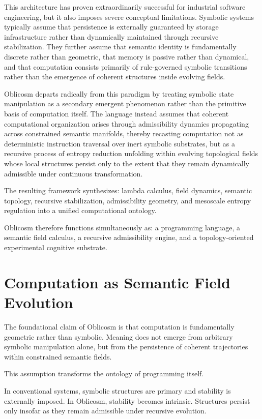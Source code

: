 \documentclass[11pt]{article}
\begin{document}
This architecture has proven extraordinarily successful for industrial software engineering, but it also imposes severe conceptual limitations. Symbolic systems typically assume that persistence is externally guaranteed by storage infrastructure rather than dynamically maintained through recursive stabilization. They further assume that semantic identity is fundamentally discrete rather than geometric, that memory is passive rather than dynamical, and that computation consists primarily of rule-governed symbolic transitions rather than the emergence of coherent structures inside evolving fields.

Oblicosm departs radically from this paradigm by treating symbolic state manipulation as a secondary emergent phenomenon rather than the primitive basis of computation itself. The language instead assumes that coherent computational organization arises through admissibility dynamics propagating across constrained semantic manifolds, thereby recasting computation not as deterministic instruction traversal over inert symbolic substrates, but as a recursive process of entropy reduction unfolding within evolving topological fields whose local structures persist only to the extent that they remain dynamically admissible under continuous transformation.

The resulting framework synthesizes:
lambda calculus,
field dynamics,
semantic topology,
recursive stabilization,
admissibility geometry,
and mesoscale entropy regulation
into a unified computational ontology.

Oblicosm therefore functions simultaneously as:
a programming language,
a semantic field calculus,
a recursive admissibility engine,
and a topology-oriented experimental cognitive substrate.

\section{Computation as Semantic Field Evolution}

The foundational claim of Oblicosm is that computation is fundamentally geometric rather than symbolic. Meaning does not emerge from arbitrary symbolic manipulation alone, but from the persistence of coherent trajectories within constrained semantic fields.

This assumption transforms the ontology of programming itself.

In conventional systems, symbolic structures are primary and stability is externally imposed. In Oblicosm, stability becomes intrinsic. Structures persist only insofar as they remain admissible under recursive evolution.
\end{document}
